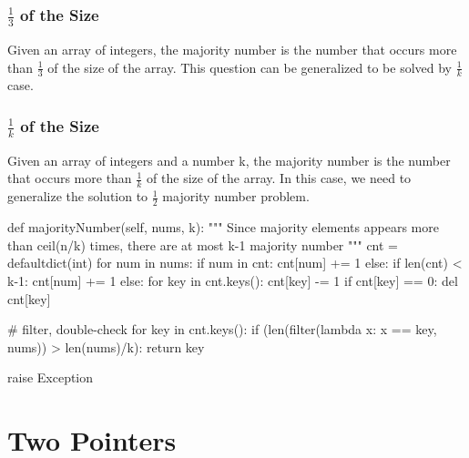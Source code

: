 \subsubsection{$\frac{1}{3}$ of the Size}
Given an array of integers, the majority number is the number that occurs more than $\frac{1}{3}$ of the size of the array. This question can be generalized to be solved by $\frac{1}{k}$ case. 

\subsubsection{$\frac{1}{k}$ of the Size}
Given an array of integers and a number k, the majority number is the number that occurs more than $\frac{1}{k}$ of the size of the array. In this case, we need to generalize the solution to $\frac{1}{2}$ majority number problem.
\newpag
\begin{python}

def majorityNumber(self, nums, k):
    """
    Since majority elements appears more 
    than ceil(n/k) times, there are at 
    most k-1 majority number
    """
    cnt = defaultdict(int)
    for num in nums:
        if num in cnt:
            cnt[num] += 1
        else:
            if len(cnt) < k-1:
                cnt[num] += 1
            else:
                for key in cnt.keys():
                    cnt[key] -= 1
                    if cnt[key] == 0: del cnt[key]
    
    
    # filter, double-check
    for key in cnt.keys():
        if (len(filter(lambda x: x == key, nums)) 
            > len(nums)/k):
            return key

    raise Exception
\end{python}


\section{Two Pointers}
